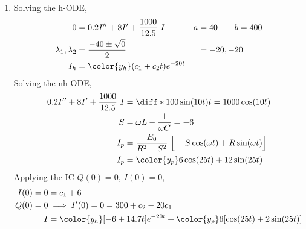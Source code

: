 \begin{enumerate}
    \item Solving the h-ODE,
          \begin{align}
              0                        & = 0.2I'' + 8I' + \frac{1000}{12.5}\ I    & a & = 40 \qquad b = 400 \\
              \lambda_{1}, \lambda_{2} & = \frac{-40 \pm \sqrt{0}}{2}             &   & = -20, -20          \\
              I_{h}                    & = {\color{y_h} (c_{1} + c_{2}t)e^{-20t}}
          \end{align}
          Solving the nh-ODE,
          \begin{align}
              0.2I'' + 8I' + \frac{1000}{12.5}\ I & = \diff* {100\sin(10t)}{t} = 1000\cos(10t)                                  \\
              S                                   & = \omega L - \frac{1}{\omega C} = -6                                        \\
              I_{p}                               & = \frac{E_{0}}{R^{2} + S^{2}}\ \Big[-S\cos(\omega t) + R\sin(\omega t)\Big] \\
              I_{p}                               & = {\color{y_p}  6\cos(25t) + 12\sin(25t) }                                  \\
          \end{align}
          Applying the IC $ Q(0) = 0,\ I(0) = 0 $,
          \begin{align}
              I(0) = 0 & = c_{1} + 6                                                                    \\
              Q(0) = 0 & \implies I'(0) = 0 = 300 + c_{2} - 20c_{1}                                     \\
              I        & = {\color{y_h} [-6 + 14.7t]e^{-20t}} + {\color{y_p} 6[\cos(25t) + 2\sin(25t)]}
          \end{align}
          \begin{figure}[H]
              \centering
          \end{figure}


\end{enumerate}
